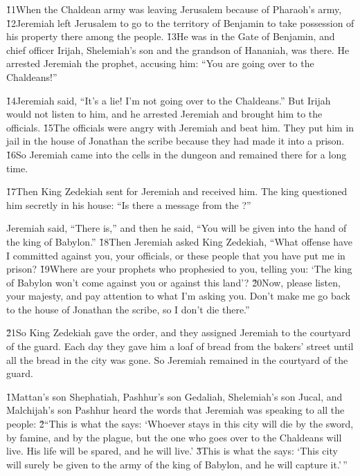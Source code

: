 \v{11}When the Chaldean army was leaving Jerusalem because of Pharaoh's army, \v{12}Jeremiah left Jerusalem to go to the territory of Benjamin to take possession of his property there among the people. \v{13}He was in the Gate of Benjamin, and chief officer Irijah, Shelemiah's son and the grandson of Hananiah, was there. He arrested Jeremiah the prophet, accusing him: ``You are going over to the Chaldeans!''

\v{14}Jeremiah said, ``It's a lie! I'm not going over to the Chaldeans.'' But Irijah would not listen to him, and he arrested Jeremiah and brought him to the officials. \v{15}The officials were angry with Jeremiah and beat him. They put him in jail in the house of Jonathan the scribe because they had made it into a prison. \v{16}So Jeremiah came into the cells in the dungeon and remained there for a long time.

\v{17}Then King Zedekiah sent for Jeremiah and received him. The king questioned him secretly in his house: ``Is there a message from the ?''

Jeremiah said, ``There is,'' and then he said, ``You will be given into the hand of the king of Babylon.'' \v{18}Then Jeremiah asked King Zedekiah, ``What offense have I committed against you, your officials, or these people that you have put me in prison? \v{19}Where are your prophets who prophesied to you, telling you: `The king of Babylon won't come against you or against this land'? \v{20}Now, please listen, your majesty, and pay attention to what I'm asking you. Don't make me go back to the house of Jonathan the scribe, so I don't die there.''

\v{21}So King Zedekiah gave the order, and they assigned Jeremiah to the courtyard of the guard. Each day they gave him a loaf of bread from the bakers' street until all the bread in the city was gone. So Jeremiah remained in the courtyard of the guard.

\v{1}Mattan's son Shephatiah, Pashhur's son Gedaliah, Shelemiah's son Jucal, and Malchijah's son Pashhur heard the words that Jeremiah was speaking to all the people: \v{2}``This is what the  says: `Whoever stays in this city will die by the sword, by famine, and by the plague, but the one who goes over to the Chaldeans will live. His life will be spared, and he will live.' \v{3}This is what the  says: `This city will surely be given to the army of the king of Babylon, and he will capture it.'\,''

